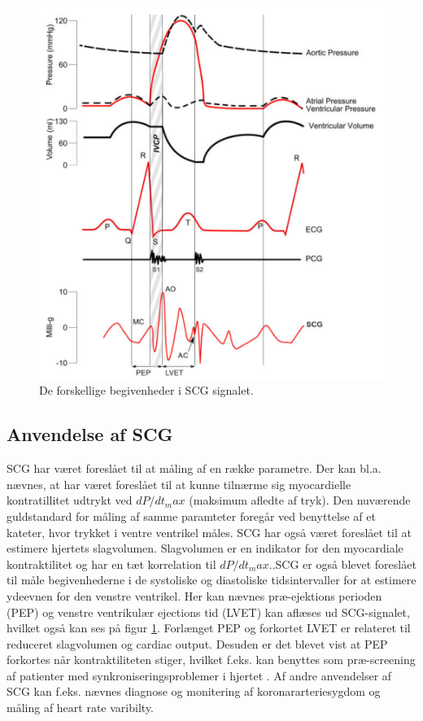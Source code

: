 \begin{figure}[H] %
\begin{center}
\includegraphics[width=1\textwidth]{figures/wigger}
\end{center}
\caption{De forskellige begivenheder i SCG signalet. \cite{zanetti}}
\label{fig:wigger}
\end{figure}


\subsection{Anvendelse af SCG}
SCG har været foreslået til at måling af en række parametre. Der kan bl.a. nævnes, at har været foreslået til at kunne tilnærme sig myocardielle kontratillitet udtrykt ved $dP/dt_max$ (maksimum afledte af tryk). Den nuværende guldstandard for måling af samme paramteter foregår ved benyttelse af et kateter, hvor trykket i ventre ventrikel måles. SCG har også været foreslået til at estimere hjertets slagvolumen. Slagvolumen er en indikator for den myocardiale kontraktilitet og har en tæt korrelation til $dP/dt_max$..SCG er også blevet foreslået til måle begivenhederne i de systoliske og diastoliske tidsintervaller for at estimere ydeevnen for den venstre ventrikel. Her kan nævnes  præ-ejektions perioden (PEP) og venstre ventrikulær ejections tid (LVET) kan aflæses ud SCG-signalet, hvilket også kan ses på figur \ref{fig:wigger}. Forlænget PEP og forkortet LVET er relateret til reduceret slagvolumen og cardiac output. Desuden er det blevet vist at PEP forkortes når kontraktiliteten stiger, hvilket f.eks. kan benyttes som præ-screening af patienter med synkroniseringsproblemer i hjertet  \cite{zanetti}  \cite{abra}. Af andre anvendelser af SCG kan f.eks. nævnes diagnose og monitering af koronararteriesygdom og måling af heart rate varibilty.

